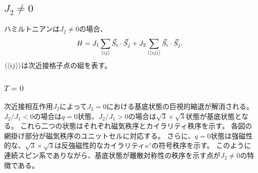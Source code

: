 \documentclass[12pt,titlepage,dvipdfmx]{jarticle}
\begin{document}


\subsection{$J_2\neq0$}
ハミルトニアンは$J_2\neq0$の場合、
\begin{align}
   H = J_1\sum_{\ev{ij}}\vec{S}_i\cdot\vec{S}_j + J_2\sum_{\ev{\ev{ij}}}\vec{S}_i\cdot\vec{S}_j .
\end{align}
$\ev{\ev{ij}}$は次近接格子点の組を表す。
\subsubsection{$T=0$}
次近接相互作用$J_2$によって$J_2=0$における基底状態の巨視的縮退が解消される。
$J_2/J_1<0$の場合は$q=0$状態、$J_2/J_1>0$の場合は$\sqrt{3}\times\sqrt{3}$状態が基底状態となる\cite{Harris1992}。
これら二つの状態はそれぞれ磁気秩序とカイラリティ秩序を示す。
各図の網掛け部分が磁気秩序のユニットセルに対応する。
さらに、$q=0$状態は強磁性的な、$\sqrt{3}\times\sqrt{3}$は反強磁性的なカイラリティ$\kappa^z$の符号秩序を示す。
このように連続スピン系でありながら、基底状態が離散対称性の秩序を示す点が$J_2\neq0$の特徴である。

%   
\end{document}
